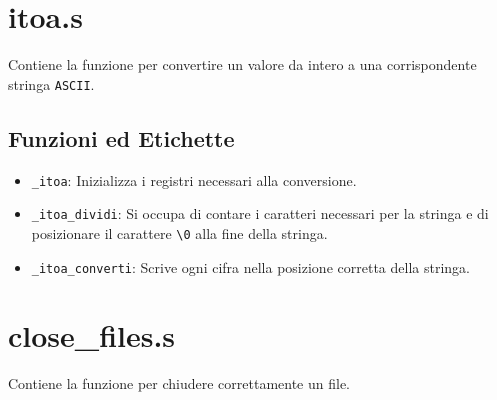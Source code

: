 \documentclass[a4paper,11pt]{article}
\newcommand{\itemtt}[1]{\item \texttt{#1}}
\begin{document}
	\section{itoa.s}
	Contiene la funzione per convertire un valore da intero a una corrispondente stringa \texttt{ASCII}.
	\subsection{Funzioni ed Etichette} 
		\begin{itemize}
			\itemtt{\_itoa}: Inizializza i registri necessari alla conversione.
			\itemtt{\_itoa\_dividi}: Si occupa di contare i caratteri necessari per la stringa e di posizionare il carattere \texttt{\textbackslash 0} alla fine della stringa.
			\itemtt{\_itoa\_converti}: Scrive ogni cifra nella posizione corretta della stringa.
		\end{itemize}
	
	\section{close\_files.s}
	Contiene la funzione per chiudere correttamente un file. 
	

	
	
\end{document}
